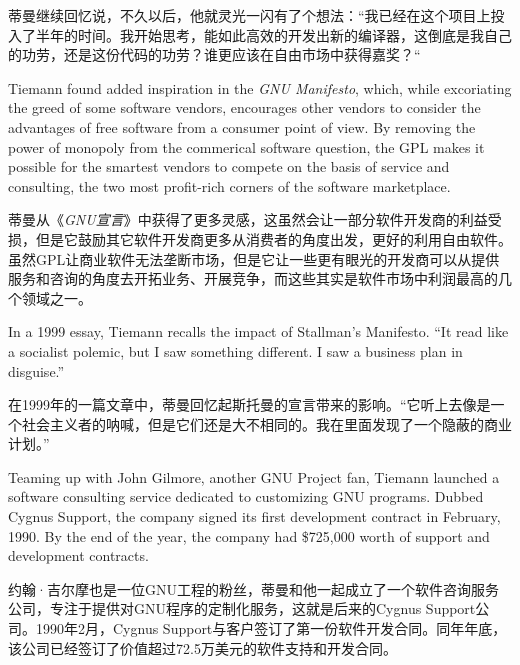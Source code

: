 \ifdefined\chs
蒂曼继续回忆说，不久以后，他就灵光一闪有了个想法：``我已经在这个项目上投入了半年的时间。我开始思考，能如此高效的开发出新的编译器，这倒底是我自己的功劳，还是这份代码的功劳？谁更应该在自由市场中获得嘉奖？``
\fi

\ifdefined\eng
Tiemann found added inspiration in the \textit{GNU Manifesto}, which, while excoriating the greed of some software vendors, encourages other vendors to consider the advantages of free software from a consumer point of view. By removing the power of monopoly from the commerical software question, the GPL makes it possible for the smartest vendors to compete on the basis of service and consulting, the two most profit-rich corners of the software marketplace.
\fi

\ifdefined\chs
蒂曼从《\textit{GNU宣言}》中获得了更多灵感，这虽然会让一部分软件开发商的利益受损，但是它鼓励其它软件开发商更多从消费者的角度出发，更好的利用自由软件。虽然GPL让商业软件无法垄断市场，但是它让一些更有眼光的开发商可以从提供服务和咨询的角度去开拓业务、开展竞争，而这些其实是软件市场中利润最高的几个领域之一。
\fi

\ifdefined\eng
In a 1999 essay, Tiemann recalls the impact of Stallman's Manifesto. ``It read like a socialist polemic, but I saw something different. I saw a business plan in disguise.''
\fi

\ifdefined\chs
在1999年的一篇文章中，蒂曼回忆起斯托曼的宣言带来的影响。``它听上去像是一个社会主义者的呐喊，但是它们还是大不相同的。我在里面发现了一个隐蔽的商业计划。'' 
\fi

\ifdefined\eng
Teaming up with John Gilmore, another GNU Project fan, Tiemann launched a software consulting service dedicated to customizing GNU programs. Dubbed Cygnus Support, the company signed its first development contract in February, 1990. By the end of the year, the company had \$725,000 worth of support and development contracts.
\fi

\ifdefined\chs
约翰·吉尔摩也是一位GNU工程的粉丝，蒂曼和他一起成立了一个软件咨询服务公司，专注于提供对GNU程序的定制化服务，这就是后来的Cygnus Support公司。1990年2月，Cygnus Support与客户签订了第一份软件开发合同。同年年底，该公司已经签订了价值超过72.5万美元的软件支持和开发合同。
\fi

